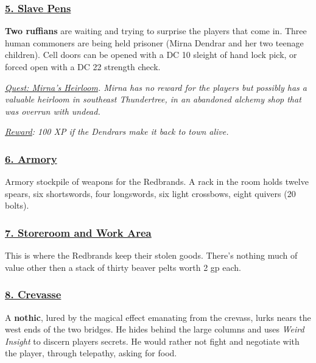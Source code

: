 \subsubsection*{\underline{5. Slave Pens}}
\textbf{Two ruffians} are waiting and trying to surprise the players that come in. Three human commoners are being held prisoner (Mirna Dendrar and her two teenage children). Cell doors can be opened with a DC 10 sleight of hand lock pick, or forced open with a DC 22 strength check.

\emph{\underline{Quest: Mirna's Heirloom}. Mirna has no reward for the players but possibly has a valuable heirloom in southeast Thundertree, in an abandoned alchemy shop that was overrun with undead. }

\emph{\underline{Reward}: 100 XP if the Dendrars make it back to town alive.}

\subsubsection*{\underline{6. Armory}}
Armory stockpile of weapons for the Redbrands. A rack in the room holds twelve spears, six shortswords, four longswords, six light crossbows, eight quivers (20 bolts).

\subsubsection*{\underline{7. Storeroom and Work Area}}
This is where the Redbrands keep their stolen goods. There's nothing much of value other then a stack of thirty beaver pelts worth 2 gp each.

\subsubsection*{\underline{8. Crevasse}}
A \textbf{nothic}, lured by the magical effect emanating from the crevass, lurks nears the west ends of the two bridges. He hides behind the large columns and uses \emph{Weird Insight} to discern players secrets. He would rather not fight and negotiate with the player, through telepathy, asking for food.

